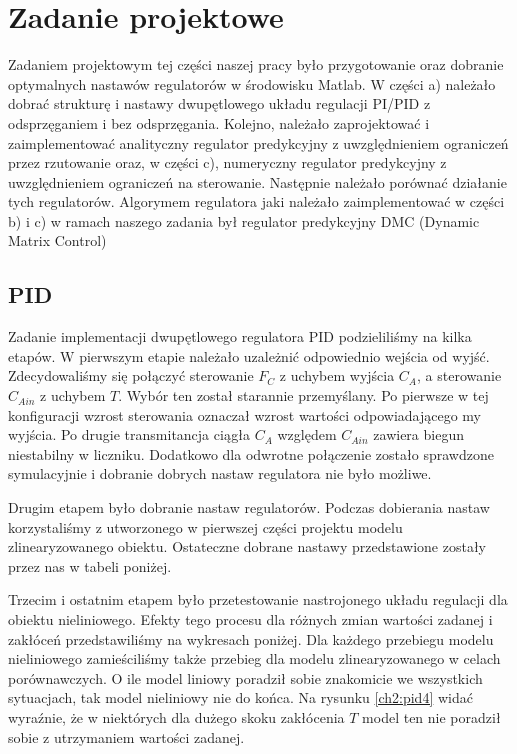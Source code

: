 \chapter{Zadanie projektowe}

Zadaniem projektowym tej części naszej pracy było przygotowanie oraz dobranie optymalnych nastawów regulatorów w środowisku Matlab. W części a) należało dobrać strukturę i nastawy dwupętlowego układu regulacji PI/PID z odsprzęganiem i bez odsprzęgania. Kolejno, należało zaprojektować i zaimplementować analityczny regulator predykcyjny z uwzględnieniem ograniczeń przez rzutowanie oraz, w części c), numeryczny regulator predykcyjny z uwzględnieniem ograniczeń na sterowanie. Następnie należało porównać działanie tych regulatorów. Algorymem regulatora jaki należało zaimplementować w części b) i c) w ramach naszego zadania był regulator predykcyjny DMC (Dynamic Matrix Control)

\section{PID}
Zadanie implementacji dwupętlowego regulatora PID podzieliliśmy na kilka etapów. W pierwszym etapie należało uzależnić odpowiednio wejścia od wyjść. Zdecydowaliśmy się połączyć sterowanie $F_C$ z uchybem wyjścia $C_A$, a sterowanie $C_{Ain}$ z uchybem $T$. Wybór ten został starannie przemyślany. Po pierwsze w tej konfiguracji wzrost sterowania oznaczał wzrost wartości odpowiadającego my wyjścia. Po drugie transmitancja ciągła $C_A$ względem $C_{Ain}$ zawiera biegun niestabilny w liczniku. Dodatkowo dla odwrotne połączenie zostało sprawdzone symulacyjnie i dobranie dobrych nastaw regulatora nie było możliwe.

Drugim etapem było dobranie nastaw regulatorów. Podczas dobierania nastaw korzystaliśmy z utworzonego w pierwszej części projektu modelu zlinearyzowanego obiektu. Ostateczne dobrane nastawy przedstawione zostały przez nas w tabeli poniżej.

Trzecim i ostatnim etapem było przetestowanie nastrojonego układu regulacji dla obiektu nieliniowego. Efekty tego procesu dla różnych zmian wartości zadanej i zakłóceń przedstawiliśmy na wykresach poniżej. Dla każdego przebiegu modelu nieliniowego zamieściliśmy także przebieg dla modelu zlinearyzowanego w celach porównawczych. O ile model liniowy poradził sobie znakomicie we wszystkich sytuacjach, tak model nieliniowy nie do końca. Na rysunku \ref{ch2:pid4} widać wyraźnie, że w niektórych dla dużego skoku zakłócenia $T$ model ten nie poradził sobie z utrzymaniem wartości zadanej.


